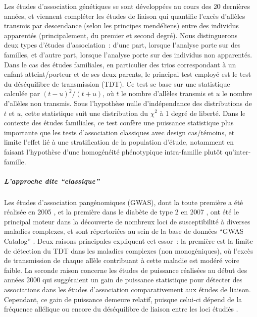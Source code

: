 \documentclass[11pt,a4paper,notrimn]{krantz}
\let\oldsubparagraph\subparagraph
\renewcommand{\subparagraph}[1]{\oldsubparagraph{#1}\mbox{}}
\theoremstyle{definition}
\theoremstyle{definition}
\theoremstyle{remark}
\begin{document}
Les études d'association génétiques se sont développées au cours des 20
dernières années, et viennent compléter les études de liaison qui
quantifie l'excès d'allèles transmis par descendance (selon les
principes mendéliens) entre des individus apparentés (principalement, du
premier et second degré). Nous distinguerons deux types d'études
d'association~: d'une part, lorsque l'analyse porte sur des familles, et
d'autre part, lorsque l'analyse porte sur des individus non apparentés.
Dans le cas des études familiales, en particulier des trios
correspondant à un enfant atteint/porteur et de ses deux parents, le
principal test employé est le test du déséquilibre de transmission
(TDT). Ce test se base sur une statistique calculée par
\((t-u)^2 / (t+u)\), où \(t\) le nombre d'allèles transmis et \(u\) le
nombre d'allèles non transmis. Sous l'hypothèse nulle d'indépendance des
distributions de \(t\) et \(u\), cette statistique suit une distribution
du \(\chi^2\) à 1 degré de liberté. Dans le contexte des études
familiales, ce test confère une puissance statistique plus importante
que les tests d'association classiques avec design cas/témoins, et
limite l'effet lié à une stratification de la population d'étude,
notamment en faisant l'hypothèse d'une homogénéité phénotypique
intra-famille plutôt qu'inter-famille.

\subparagraph{\texorpdfstring{L'approche dite
``classique''}{L'approche dite classique}}\label{lapproche-dite-classique}

Les études d'association pangénomiques (GWAS), dont la toute première a
été réalisée en 2005 \citep{klein_complement_2005}, et la première dans
le diabète de type 2 en 2007 \citep{sladek_genome-wide_2007}, ont été le
principal moteur dans la découverte de nombreux loci de susceptibilité à
diverses maladies complexes, et sont répertoriées au sein de la base de
données ``GWAS Catalog'' \citep{macarthur_new_2017}. Deux raisons
principales expliquent cet essor~: la première est la limite de
détection du TDT dans les maladies complexes (non monogéniques), où
l'excès de transmission de chaque allèle contribuant à cette maladie est
modéré voire faible. La seconde raison concerne les études de puissance
réalisées au début des années 2000
\citep{risch_future_1996, sham_power_2000} qui suggéraient un gain de
puissance statistique pour détecter des associations dans les études
d'association comparativement aux études de liaison. Cependant, ce gain
de puissance demeure relatif, puisque celui-ci dépend de la fréquence
allélique ou encore du déséquilibre de liaison entre les loci étudiés
\citep{tu_power_1999}.
\end{document}
